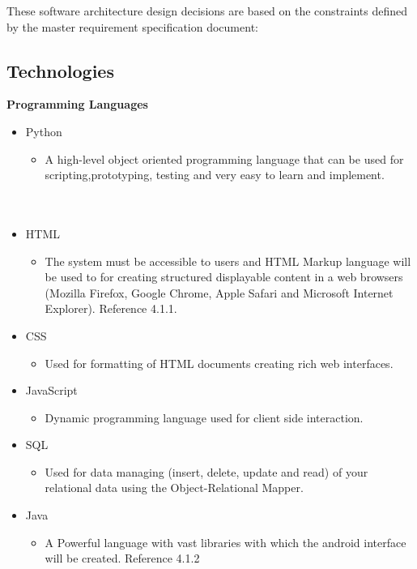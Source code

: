 \documentclass[12pt]{article}
\begin{document}
These software architecture design decisions are based on the constraints defined by the master requirement specification document:

		\vspace{0.5cm}
		
	\subsection{Technologies}
	
		\vspace{0.5cm}
	
		\indent\indent \textbf{Programming Languages}
		\begin{itemize}
			\item Python
			\begin{itemize}
			\item A high-level object oriented programming language that can be used for scripting,prototyping, testing and very easy to learn and implement.\\\\\\
			\end{itemize}
			\item HTML
			\begin{itemize}
			\item The system must be accessible to users and HTML Markup language will be used to for 	creating structured displayable content in a web browsers (Mozilla Firefox, Google Chrome, Apple Safari and Microsoft Internet Explorer). Reference 4.1.1.
			\end{itemize}
			\item CSS
			\begin{itemize}
			\item Used for formatting of HTML documents creating rich web interfaces.
			\end{itemize}
			\item JavaScript
			\begin{itemize}
			\item Dynamic programming language used for client side interaction.
			\end{itemize}
			\item SQL
			\begin{itemize}
			\item Used for data managing (insert, delete, update and read) of your relational data using the Object-Relational Mapper.
			\end{itemize}
			\item Java
			\begin{itemize}
			\item A Powerful language with vast libraries with which the android interface will be created. Reference 4.1.2
			\end{itemize}
		\end{itemize}
		
\end{document}
